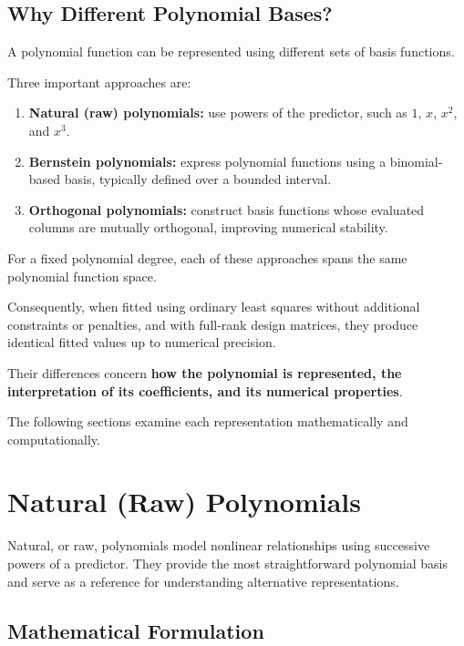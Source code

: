 \documentclass[
  letterpaper,
  DIV=11,
  numbers=noendperiod]{scrreprt}
\providecommand{\tightlist}{%
  \setlength{\itemsep}{0pt}\setlength{\parskip}{0pt}}
\begin{document}
\subsection{Why Different Polynomial
Bases?}\label{why-different-polynomial-bases}

A polynomial function can be represented using different sets of basis
functions.

Three important approaches are:

\begin{enumerate}
\def\labelenumi{\arabic{enumi}.}
\tightlist
\item
  \textbf{Natural (raw) polynomials:} use powers of the predictor, such
  as \(1\), \(x\), \(x^2\), and \(x^3\).
\item
  \textbf{Bernstein polynomials:} express polynomial functions using a
  binomial-based basis, typically defined over a bounded interval.
\item
  \textbf{Orthogonal polynomials:} construct basis functions whose
  evaluated columns are mutually orthogonal, improving numerical
  stability.
\end{enumerate}

For a fixed polynomial degree, each of these approaches spans the same
polynomial function space.

Consequently, when fitted using ordinary least squares without
additional constraints or penalties, and with full-rank design matrices,
they produce identical fitted values up to numerical precision.

Their differences concern \textbf{how the polynomial is represented, the
interpretation of its coefficients, and its numerical properties}.

The following sections examine each representation mathematically and
computationally.

\section{Natural (Raw) Polynomials}\label{natural-raw-polynomials}

Natural, or raw, polynomials model nonlinear relationships using
successive powers of a predictor. They provide the most straightforward
polynomial basis and serve as a reference for understanding alternative
representations.

\subsection{Mathematical Formulation}\label{mathematical-formulation-1}
\end{document}
